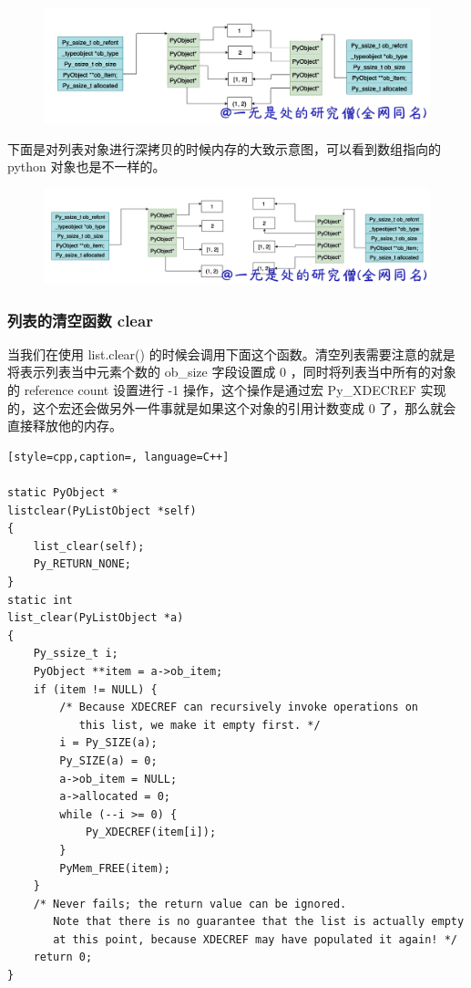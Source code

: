     \begin{figure}[H]
        \centering
            \includegraphics[scale=.3]{images/07-list.png}
            \caption{ }
        \label{fig:my_label}
    \end{figure}
    
下面是对列表对象进行深拷贝的时候内存的大致示意图，可以看到数组指向的 python 对象也是不一样的。

    \begin{figure}[H]
        \centering
            \includegraphics[scale=.3]{images/08-list.png}
            \caption{ }
        \label{fig:my_label}
    \end{figure}
    
\subsubsection{列表的清空函数 clear}
当我们在使用 list.clear() 的时候会调用下面这个函数。清空列表需要注意的就是将表示列表当中元素个数的 ob\_size 字段设置成 0 ，同时将列表当中所有的对象的 reference count 设置进行 -1 操作，这个操作是通过宏 Py\_XDECREF 实现的，这个宏还会做另外一件事就是如果这个对象的引用计数变成 0 了，那么就会直接释放他的内存。
\begin{lstlisting}[style=cpp,caption=, language=C++]

static PyObject *
listclear(PyListObject *self)
{
    list_clear(self);
    Py_RETURN_NONE;
}
static int
list_clear(PyListObject *a)
{
    Py_ssize_t i;
    PyObject **item = a->ob_item;
    if (item != NULL) {
        /* Because XDECREF can recursively invoke operations on
           this list, we make it empty first. */
        i = Py_SIZE(a);
        Py_SIZE(a) = 0;
        a->ob_item = NULL;
        a->allocated = 0;
        while (--i >= 0) {
            Py_XDECREF(item[i]);
        }
        PyMem_FREE(item);
    }
    /* Never fails; the return value can be ignored.
       Note that there is no guarantee that the list is actually empty
       at this point, because XDECREF may have populated it again! */
    return 0;
}
\end{lstlisting}
